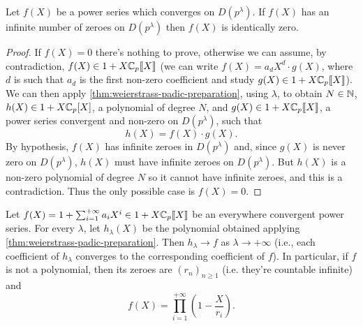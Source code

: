 		\begin{lemma}
			\label{lemma:infinite-zeroes}
			Let $f(X)$ be a power series which converges on $D(p^{\lambda})$. If $f(X)$ has an infinite number of zeroes on $D(p^{\lambda})$ then $f(X)$ is identically zero.
		\end{lemma}
		\begin{proof}
			If $f(X) = 0$ there's nothing to prove, otherwise we can assume, by contradiction, $f(X) \in 1 + X\mathbb{C}_p\llbracket {X} \rrbracket$ (we can write $f(X) = a_dX^d \cdot g(X)$, where $d$ is such that $a_d$ is the first non-zero coefficient and study $g(X) \in 1 + X\mathbb{C}_p\llbracket {X} \rrbracket$). We can then apply \cref{thm:weierstrass-padic-preparation}, using $\lambda$, to obtain $N \in \mathbb{N}$, $h(X) \in 1 + X\mathbb{C}_p[X]$, a polynomial of degree $N$, and $g(X) \in 1 + X\mathbb{C}_p\llbracket {X} \rrbracket$, a power series convergent and non-zero on $D(p^{\lambda})$, such that
			\[
				h(X) = f(X) \cdot g(X).
			\]
			By hypothesis, $f(X)$ has infinite zeroes in $D(p^{\lambda})$ and, since $g(X)$ is never zero on $D(p^{\lambda})$, $h(X)$ must have infinite zeroes on $D(p^{\lambda})$. But $h(X)$ is a non-zero polynomial of degree $N$ so it cannot have infinite zeroes, and this is a contradiction. Thus the only possible case is $f(X) = 0$.
		\end{proof}
		\begin{prop}
			Let $f(X) = 1 + \sum_{i=1}^{+\infty} a_iX^i \in 1 + X\mathbb{C}_p\llbracket {X} \rrbracket$ be an everywhere convergent power series. For every $\lambda$, let $h_{\lambda}(X)$ be the polynomial obtained applying \cref{thm:weierstrass-padic-preparation}. Then $h_{\lambda} \to f$ as $\lambda \to +\infty$ (i.e., each coefficient of $h_{\lambda}$ converges to the corresponding coefficient of $f$). In particular, if $f$ is not a polynomial, then its zeroes are $(r_n)_{n \geq 1}$ (i.e. they're countable infinite) and 
			\[
				f(X) = \prod_{i=1}^{+\infty} \left(1 - \frac{X}{r_i}\right).
			\] 
		\end{prop}
